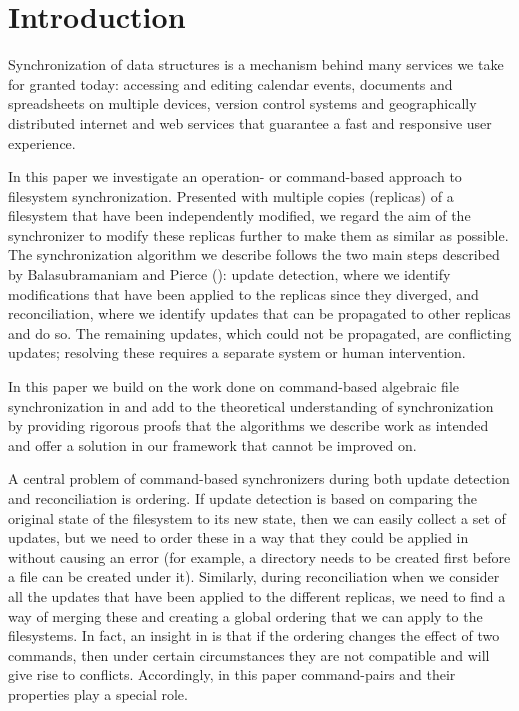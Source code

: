 
\section{Introduction}

Synchronization of data structures
is a mechanism behind many services we take for granted today:
accessing and editing calendar events, documents and spreadsheets
on multiple devices, version control systems and
geographically distributed internet and web services that
guarantee a fast and responsive user experience.

In this paper we investigate an operation- or command-based approach
to filesystem synchronization.
Presented with multiple copies (replicas) of a filesystem that have been independently modified,
we regard the aim of the synchronizer to modify these replicas further
to make them as similar as possible.
The synchronization algorithm we describe
follows the two main steps described by Balasubramaniam and Pierce (\cite{BP}):
update detection, where we identify modifications that have been applied to the replicas
since they diverged,
and reconciliation, where we identify updates that can be propagated to other replicas and do so.
The remaining updates, which could not be propagated, are conflicting updates;
resolving these requires a separate system or human intervention.

In this paper we build on the work done 
on command-based algebraic file synchronization
in \cite{NREC} and add to the theoretical understanding
of synchronization by providing rigorous proofs that the algorithms
we describe work as intended
and offer a solution in our framework that cannot be improved on.

A central problem of command-based synchronizers during both update detection and reconciliation
is ordering.
If update detection is based on comparing the original state of the filesystem
to its new state, then we can easily collect a set of updates,
but we need to order these in a way that they could be applied in
without causing an error 
(for example, a directory needs to be created first before a file can be created under it).
Similarly, during reconciliation when we consider all the updates that
have been applied to the different replicas, we need to find a way of
merging these and creating a global ordering that we can apply
to the filesystems.
In fact, an insight in \cite{NREC} is that
if the ordering changes the effect of two commands,
then under certain circumstances they are not compatible and will give rise to conflicts.
Accordingly, in this paper command-pairs and their properties
play a special role.

